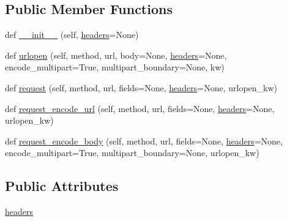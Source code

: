 \subsection*{Public Member Functions}
\begin{DoxyCompactItemize}
\item 
def \hyperlink{classpip_1_1__vendor_1_1urllib3_1_1request_1_1RequestMethods_aad45fc268dec425428d10258a6ae0961}{\+\_\+\+\_\+init\+\_\+\+\_\+} (self, \hyperlink{classpip_1_1__vendor_1_1urllib3_1_1request_1_1RequestMethods_a507ade459b427bd81a5a8849563702e3}{headers}=None)
\item 
def \hyperlink{classpip_1_1__vendor_1_1urllib3_1_1request_1_1RequestMethods_a34dbfb4bac40e78b8f474f037b7bb918}{urlopen} (self, method, url, body=None, \hyperlink{classpip_1_1__vendor_1_1urllib3_1_1request_1_1RequestMethods_a507ade459b427bd81a5a8849563702e3}{headers}=None, encode\+\_\+multipart=True, multipart\+\_\+boundary=None, kw)
\item 
def \hyperlink{classpip_1_1__vendor_1_1urllib3_1_1request_1_1RequestMethods_a9afc17c24efbf4815f747738db7ae064}{request} (self, method, url, fields=None, \hyperlink{classpip_1_1__vendor_1_1urllib3_1_1request_1_1RequestMethods_a507ade459b427bd81a5a8849563702e3}{headers}=None, urlopen\+\_\+kw)
\item 
def \hyperlink{classpip_1_1__vendor_1_1urllib3_1_1request_1_1RequestMethods_a76a39f9471397ef9b0fb79b6ea5d4bf4}{request\+\_\+encode\+\_\+url} (self, method, url, fields=None, \hyperlink{classpip_1_1__vendor_1_1urllib3_1_1request_1_1RequestMethods_a507ade459b427bd81a5a8849563702e3}{headers}=None, urlopen\+\_\+kw)
\item 
def \hyperlink{classpip_1_1__vendor_1_1urllib3_1_1request_1_1RequestMethods_a64ca2c54fdf3e2e203ebfb7ba775afea}{request\+\_\+encode\+\_\+body} (self, method, url, fields=None, \hyperlink{classpip_1_1__vendor_1_1urllib3_1_1request_1_1RequestMethods_a507ade459b427bd81a5a8849563702e3}{headers}=None, encode\+\_\+multipart=True, multipart\+\_\+boundary=None, urlopen\+\_\+kw)
\end{DoxyCompactItemize}
\subsection*{Public Attributes}
\begin{DoxyCompactItemize}
\item 
\hyperlink{classpip_1_1__vendor_1_1urllib3_1_1request_1_1RequestMethods_a507ade459b427bd81a5a8849563702e3}{headers}
\end{DoxyCompactItemize}


